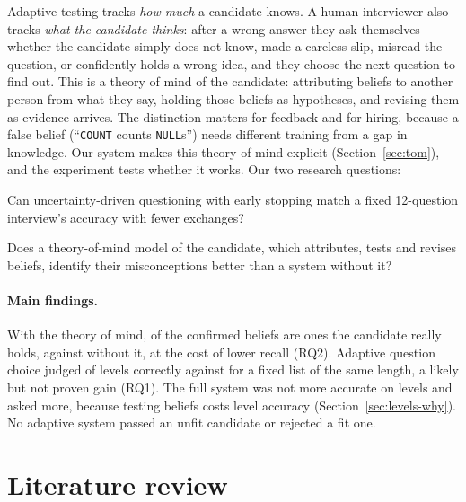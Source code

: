 \documentclass[10pt,a4paper]{article}
\begin{document}
Adaptive testing tracks \emph{how much} a candidate knows. A human interviewer also tracks \emph{what
the candidate thinks}: after a wrong answer they ask themselves whether the candidate simply does not
know, made a careless slip, misread the question, or confidently holds a wrong idea, and they choose
the next question to find out. This is a theory of mind of the candidate: attributing beliefs to
another person from what they say, holding those beliefs as hypotheses, and revising them as evidence
arrives. The distinction matters for feedback and for hiring, because a false belief (``\texttt{COUNT}
counts \texttt{NULL}s'') needs different training from a gap in knowledge. Our system makes this
theory of mind explicit (Section~\ref{sec:tom}), and the experiment tests whether it works. Our two
research questions:

\begin{description}[leftmargin=1.2cm,style=nextline]
  \item[RQ1] Can uncertainty-driven questioning with early stopping match a fixed 12-question
  interview's accuracy with fewer exchanges?
  \item[RQ2] Does a theory-of-mind model of the candidate, which attributes, tests and revises
  beliefs, identify their misconceptions better than a system without it?
\end{description}

\paragraph{Main findings.} With the theory of mind, \fPrecisionFull{} of the confirmed beliefs are
ones the candidate really holds, against \fPrecisionAfour{} without it, at the cost of lower recall
(RQ2). Adaptive question choice judged \fAccAdapt{} of levels correctly against \fAccBOne{} for a
fixed list of the same length, a likely but not proven gain (RQ1). The full system was not more
accurate on levels and asked more, because testing beliefs costs level accuracy
(Section~\ref{sec:levels-why}). No adaptive system passed an unfit candidate or rejected a fit one.

\section{Literature review}
\end{document}
